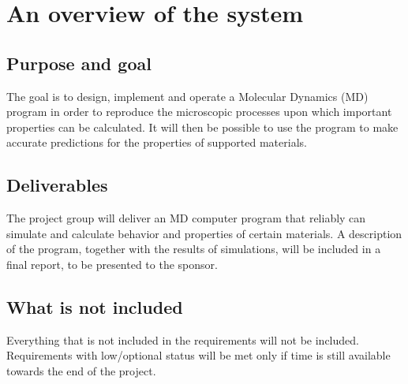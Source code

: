 \section{An overview of the system}
\subsection{Purpose and goal}
The goal is to design, implement and operate a Molecular Dynamics (MD) program in order to reproduce the microscopic processes upon which important properties can be calculated.
It will then be possible to use the program to make accurate predictions for the properties of supported materials.

\subsection{Deliverables}
The project group will deliver an MD computer program that reliably can simulate and calculate behavior and properties of certain materials.
A description of the program, together with the results of simulations, will be included in a final report, to be presented to the sponsor.

\subsection{What is not included}
Everything that is not included in the requirements will not be included. Requirements with low/optional status will be met only if time is still available towards the end of the project.
